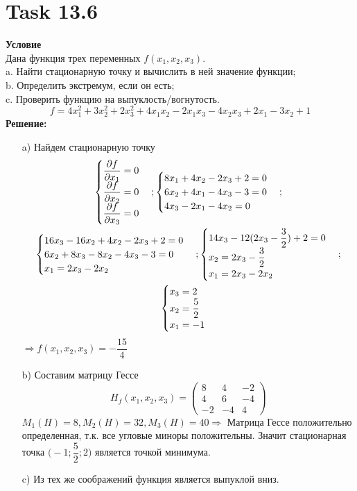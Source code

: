 \documentclass[12pt]{article}
\begin{document}
\section*{Task 13.6}
\textbf{Условие}\\
Дана функция трех переменных $f(x_1, x_2, x_3)$.\\
a. Найти стационарную точку и вычислить в ней значение функции;\\
b. Определить экстремум, если он есть; \\
c. Проверить функцию на выпуклость/вогнутость.
\begin{equation}
  f = 4x_1^2+3x_2^2+2x_3^2+4x_1x_2-2x_1x_3-4x_2x_3+2x_1-3x_2+1
\end{equation}
\textbf{Решение:}
\begin{enumerate}
  \item[a)] Найдем стационарную точку
  \begin{gather}
    \begin{cases}
        \dfrac{\partial f}{\partial x_1}=0\\
        \dfrac{\partial f}{\partial x_2}=0\\
        \dfrac{\partial f}{\partial x_3}=0
    \end{cases};
    \begin{cases}
      8x_1+4x_2-2x_3+2=0\\
      6x_2+4x_1-4x_3-3=0\\
      4x_3-2x_1-4x_2=0
    \end{cases};\\
    \begin{cases}
      16x_3-16x_2+4x_2-2x_3+2=0\\
      6x_2+8x_3-8x_2-4x_3-3=0\\
      x_1=2x_3-2x_2
    \end{cases};
    \begin{cases}
      14x_3-12(2x_3-\dfrac{3}{2})+2=0\\
      x_2=2x_3-\dfrac{3}{2}\\
      x_1=2x_3-2x_2
    \end{cases};\notag\\
    \begin{cases}
      x_3=2\\
      x_2=\dfrac{5}{2}\\
      x_1=-1
    \end{cases}\notag
  \end{gather}
  $\Rightarrow f(x_1,x_2,x_3)=
  -\dfrac{15}{4}$
  \item[b)] Составим матрицу Гессе
  \begin{equation}
    H_f(x_1,x_2,x_3)=\begin{pmatrix}
      8&4&-2\\4&6&-4\\-2&-4&4
    \end{pmatrix}
  \end{equation}
  $M_1(H)=8,M_2(H)=32,M_3(H)=40 \Rightarrow$ Матрица Гессе положительно определенная, т.к. все угловые миноры положительны. Значит стационарная
  точка $\big(-1;\dfrac{5}{2};2\big)$ является точкой минимума.
  \item[c)] Из тех же соображений функция является выпуклой вниз.
\end{enumerate}
\end{document}
